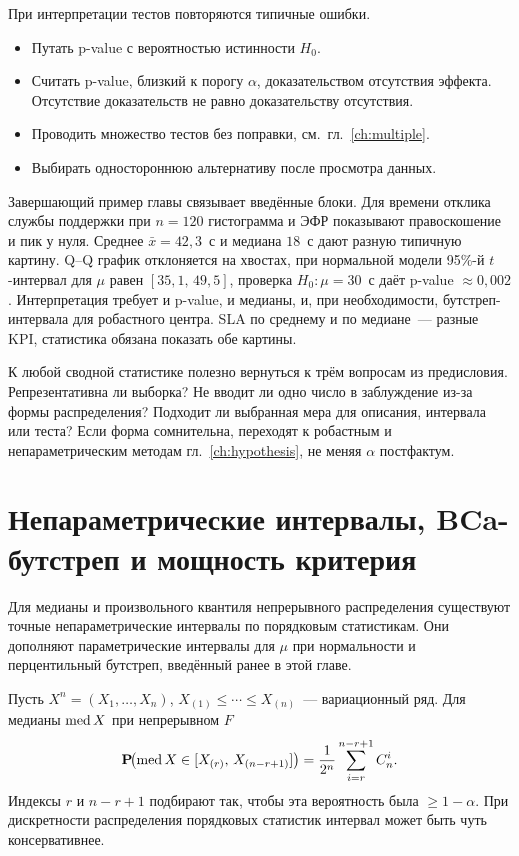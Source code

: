 При интерпретации тестов повторяются типичные ошибки.

\begin{itemize}
 \item Путать p-value с вероятностью истинности $H_0$.
 \item Считать p-value, близкий к порогу $\alpha$, доказательством отсутствия эффекта.
 Отсутствие доказательств не равно доказательству отсутствия.
 \item Проводить множество тестов без поправки, см.~гл.~\ref{ch:multiple}.
 \item Выбирать одностороннюю альтернативу после просмотра данных.
\end{itemize}

Завершающий пример главы связывает введённые блоки. Для времени отклика службы поддержки при $n=120$ гистограмма и ЭФР показывают правоскошение и пик у нуля. Среднее $\bar x=42{,}3$~с и медиана $18$~с дают разную типичную картину. Q--Q график отклоняется на хвостах, при нормальной модели 95\%-й $t$-интервал для $\mu$ равен $[35{,}1,\,49{,}5]$, проверка $H_0\colon\mu=30$~с даёт p-value $\approx 0{,}002$. Интерпретация требует и p-value, и медианы, и, при необходимости, бутстреп-интервала для робастного центра. SLA по среднему и по медиане~--- разные KPI, статистика обязана показать обе картины.

К любой сводной статистике полезно вернуться к трём вопросам из предисловия. Репрезентативна ли выборка? Не вводит ли одно число в заблуждение из-за формы распределения? Подходит ли выбранная мера для описания, интервала или теста? Если форма сомнительна, переходят к робастным и непараметрическим методам гл.~\ref{ch:hypothesis}, не меняя $\alpha$ постфактум.

\section{Непараметрические интервалы, BCa-бутстреп и мощность критерия}

Для медианы и произвольного квантиля непрерывного распределения существуют точные непараметрические интервалы по порядковым статистикам. Они дополняют параметрические интервалы для $\mu$ при нормальности и перцентильный бутстреп, введённый ранее в этой главе.

Пусть $X^n=(X_1,\ldots,X_n)$, $X_{(1)}\le\cdots\le X_{(n)}$~--- вариационный ряд.
Для медианы $\operatorname{med} X$ при непрерывном $F$ \[ \operatorname{\mathbf{P}\!}\bigl(\operatorname{med} X \in [X_{(r)},\, X_{(n-r+1)}]\bigr) =\frac1{2^n}\sum_{i=r}^{n-r+1} C_n^i.
\] Индексы $r$ и $n-r+1$ подбирают так, чтобы эта вероятность была $\ge 1-\alpha$. При дискретности распределения порядковых статистик интервал может быть чуть консервативнее.

